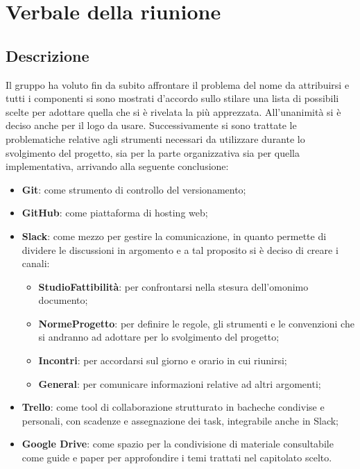 \section{Verbale della riunione}

\subsection{Descrizione}
Il gruppo ha voluto fin da subito affrontare il problema del nome da attribuirsi 
e tutti i componenti si sono mostrati d'accordo sullo stilare una lista di 
possibili scelte per adottare quella che si è rivelata la più apprezzata. 
All'unanimità si è deciso anche per il logo da usare. 
Successivamente si sono trattate le problematiche relative agli strumenti 
necessari da utilizzare durante lo svolgimento del progetto, sia per la parte 
organizzativa sia per quella implementativa, arrivando alla seguente 
conclusione:

\begin{itemize}
\item \textbf{Git}: come strumento di controllo del versionamento;
\item \textbf{GitHub}: come piattaforma di hosting web;
\item \textbf{Slack}: come mezzo per gestire la comunicazione, in quanto 
permette di dividere le discussioni in argomento e a tal proposito si è deciso 
di creare i canali:
	\begin{itemize}
		\item \textbf{StudioFattibilità}: per confrontarsi nella stesura dell'omonimo 
		documento;
		\item \textbf{NormeProgetto}: per definire le regole, gli strumenti e le 
		convenzioni che si andranno ad adottare per lo svolgimento del progetto;
		\item \textbf{Incontri}: per accordarsi sul giorno e orario in cui riunirsi;
		\item \textbf{General}: per comunicare informazioni relative ad altri 
		argomenti;
	\end{itemize}
\item \textbf{Trello}: come  tool di collaborazione strutturato in bacheche 
condivise e personali, con scadenze e assegnazione dei task, integrabile anche 
in Slack;
\item \textbf{Google Drive}: come spazio per la condivisione di materiale 
consultabile come guide e paper per approfondire i temi trattati nel capitolato 
scelto.
\end{itemize} 

